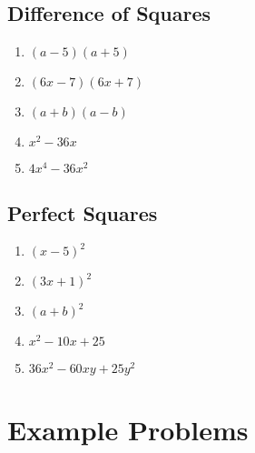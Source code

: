 \documentclass{article}
\begin{document}
\begin{multicols}{2}
        \subsection*{Difference of Squares}
        \begin{enumerate}
            \item $(a - 5)(a + 5)$
            \vspace{0.5cm}
            \item $(6x - 7)(6x + 7)$
            \vspace{0.5cm}
            \item $(a + b)(a - b)$
            \vspace{0.5cm}
            \item $x^2 - 36x$
            \vspace{0.5cm}
            \item $4x^4 - 36x^2$
            \vspace{0.5cm}
        \end{enumerate}
        \subsection*{Perfect Squares}
        \begin{enumerate}
            \item $(x - 5)^2$
            \vspace{0.5cm}
            \item $(3x + 1)^2$
            \vspace{0.5cm}
            \item $(a + b)^2$
            \vspace{0.5cm}
            \item $x^2 - 10x + 25$
            \vspace{0.5cm}
            \item $36x^2 - 60xy + 25y^2$
            \vspace{0.5cm}
        \end{enumerate}
    \end{multicols}
    \section*{Example Problems}
\end{document}
